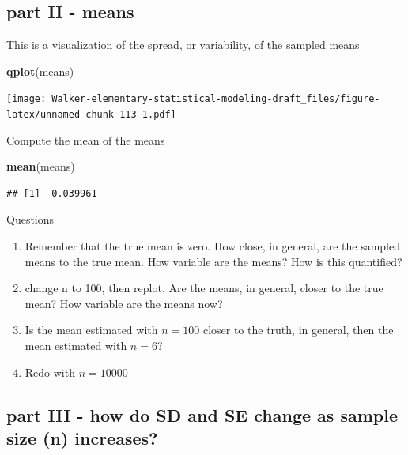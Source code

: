 \documentclass[]{book}
\newenvironment{Shaded}{\begin{snugshade}}{\end{snugshade}}
\newcommand{\KeywordTok}[1]{\textcolor[rgb]{0.13,0.29,0.53}{\textbf{#1}}}
\newcommand{\NormalTok}[1]{#1}
\providecommand{\tightlist}{%
  \setlength{\itemsep}{0pt}\setlength{\parskip}{0pt}}
\begin{document}
\hypertarget{part-ii---means}{%
\subsection{part II - means}\label{part-ii---means}}

This is a visualization of the spread, or variability, of the sampled means

\begin{Shaded}
\begin{Highlighting}[]
\KeywordTok{qplot}\NormalTok{(means)}
\end{Highlighting}
\end{Shaded}

\texttt{[image: Walker-elementary-statistical-modeling-draft\_files/figure-latex/unnamed-chunk-113-1.pdf]}

Compute the mean of the means

\begin{Shaded}
\begin{Highlighting}[]
\KeywordTok{mean}\NormalTok{(means)}
\end{Highlighting}
\end{Shaded}

\begin{verbatim}
## [1] -0.039961
\end{verbatim}

Questions

\begin{enumerate}
\def\labelenumi{\arabic{enumi}.}
\tightlist
\item
  Remember that the true mean is zero. How close, in general, are the sampled means to the true mean. How variable are the means? How is this quantified?
\item
  change n to 100, then replot. Are the means, in general, closer to the true mean? How variable are the means now?
\item
  Is the mean estimated with \(n=100\) closer to the truth, in general, then the mean estimated with \(n=6\)?
\item
  Redo with \(n=10000\)
\end{enumerate}

\hypertarget{part-iii---how-do-sd-and-se-change-as-sample-size-n-increases}{%
\subsection{part III - how do SD and SE change as sample size (n) increases?}\label{part-iii---how-do-sd-and-se-change-as-sample-size-n-increases}}
\end{document}
